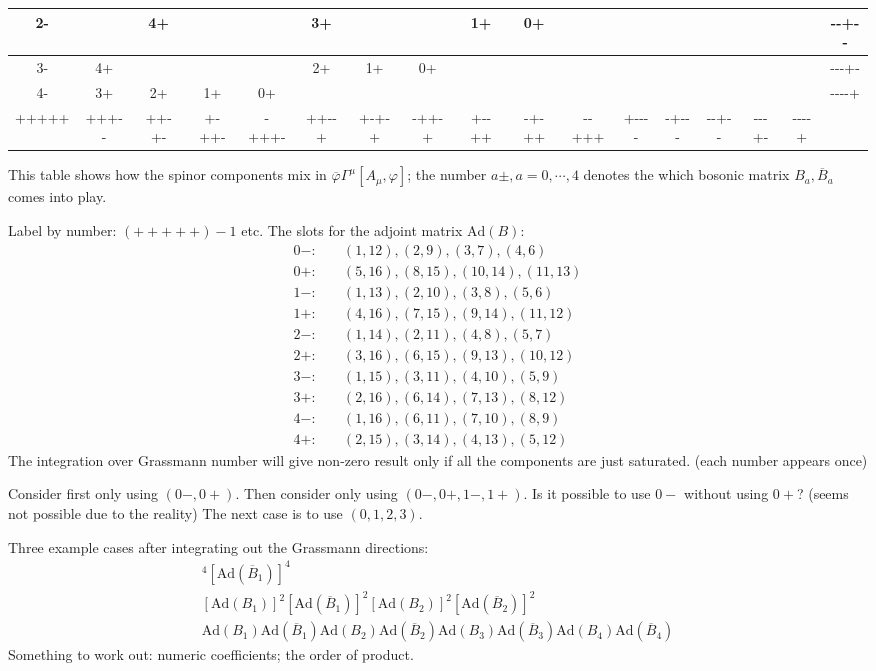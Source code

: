\begin{table}[ht]
\begin{adjustbox}{width=1\textwidth}
\begin{tabular}{|c|c|c|c|c|c|c|c|c|c|c|c|c|c|c|c|c|}
	2-    &       & 4+    &       &       & 3+    &       &       & 1+    & 0+    &       &       &       &       &       &       & -{}-+-{}- \\ \hline
3-    & 4+    &       &       &       & 2+    & 1+    & 0+    &       &       &       &       &       &       &       &       & -{}-{}-+- \\ \hline
4-    & 3+    & 2+    & 1+    & 0+    &       &       &       &       &       &       &       &       &       &       &       & -{}-{}-{}-+ \\ \hline
+++++ & +++-{}- & ++-+- & +-++- & -+++- & ++-{}-+ & +-+-+ & -++-+ & +-{}-++ & -+-++ & -{}-+++ & +-{}-{}-{}- & -+-{}-{}- & -{}-+-{}- & -{}-{}-+- & -{}-{}-{}-+ &       \\ \hline
\end{tabular}
\end{adjustbox}
\end{table}
This table shows how the spinor components mix in
$\overline{\varphi}\Gamma^\mu[A_\mu,\varphi]$;
the number $a\pm,a=0,\cdots,4$ denotes the which bosonic matrix $B_a,\overline{B}_a$ comes into play.

Label by number: $(+++++) - 1$ etc.
The slots for the adjoint matrix $\mathrm{Ad}(B)$:
\begin{align*}
	0-:&\quad (1,12),(2,9),(3,7),(4,6)\\
	0+:&\quad (5,16),(8,15),(10,14),(11,13)\\
	1-:&\quad (1,13),(2,10),(3,8),(5,6)\\
	1+:&\quad (4,16),(7,15),(9,14),(11,12)\\
	2-:&\quad (1,14),(2,11),(4,8),(5,7)\\
	2+:&\quad (3,16),(6,15),(9,13),(10,12)\\
	3-:&\quad (1,15),(3,11),(4,10),(5,9)\\
	3+:&\quad (2,16),(6,14),(7,13),(8,12)\\
	4-:&\quad (1,16),(6,11),(7,10),(8,9)\\
	4+:&\quad (2,15),(3,14),(4,13),(5,12)
\end{align*}
The integration over Grassmann number will give non-zero result
only if all the components are just saturated.
(each number appears once)

Consider first only using $(0-,0+)$.
Then consider only using $(0-,0+,1-,1+)$.
Is it possible to use $0-$ without using $0+$?
(seems not possible due to the reality)
The next case is to use $(0,1,2,3)$.

Three example cases after integrating out the Grassmann directions:
\begin{gather*}
	[\mathrm{Ad}(B_1)]^4	[\mathrm{Ad}(\overline{B}_1)]^4 \\
	[\mathrm{Ad}(B_1)]^2 [\mathrm{Ad}(\overline{B}_1)]^2
	[\mathrm{Ad}(B_2)]^2 [\mathrm{Ad}(\overline{B}_2)]^2\\
	\mathrm{Ad}(B_1)\mathrm{Ad}(\overline{B}_1)
	\mathrm{Ad}(B_2) \mathrm{Ad}(\overline{B}_2)
	\mathrm{Ad}(B_3) \mathrm{Ad}(\overline{B}_3)
	\mathrm{Ad}(B_4)\mathrm{Ad}(\overline{B}_4)
\end{gather*}
Something to work out: numeric coefficients; the order of product.
